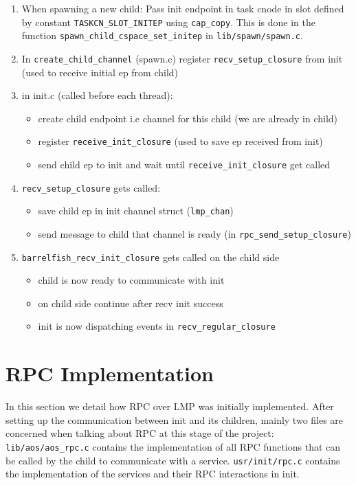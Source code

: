 \begin{enumerate}
    \item When spawning a new child: Pass init endpoint in task cnode in slot defined by constant \verb|TASKCN_SLOT_INITEP| using \verb|cap_copy|. This is done in the function \verb|spawn_child_cspace_set_initep| in \verb|lib/spawn/spawn.c|.
    \item In \verb|create_child_channel| (spawn.c) register
    \verb|recv_setup_closure| from init
    (used to receive initial ep from child)
    \item in init.c (called before each thread):
        \begin{itemize}
            \item create child endpoint i.e channel for this child (we are already in child)
            \item register \verb|receive_init_closure| (used to save ep received from init)
            \item send child ep to init and wait until
            \verb|receive_init_closure| get called
        \end{itemize}
    \item \verb|recv_setup_closure| gets called:
        \begin{itemize} 
            \item save child ep in init channel struct (\verb|lmp_chan|)
            \item send message to child that channel is ready (in \verb|rpc_send_setup_closure|)
        \end{itemize}
    \item \verb|barrelfish_recv_init_closure| gets called on the child side
        \begin{itemize}
            \item child is now ready to communicate with init
            \item on child side continue after recv init success
            \item init is now dispatching events in \verb|recv_regular_closure|
        \end{itemize}
\end{enumerate}

\section{RPC Implementation}

In this section we detail how RPC over LMP was initially implemented. After setting up the communication between init and its children, mainly two files are concerned when talking about RPC at this stage of the project: \verb|lib/aos/aos_rpc.c| contains the implementation of all RPC functions that can be called by the child to communicate with a service. \verb|usr/init/rpc.c| contains the implementation of the services and their RPC interactions in init.

